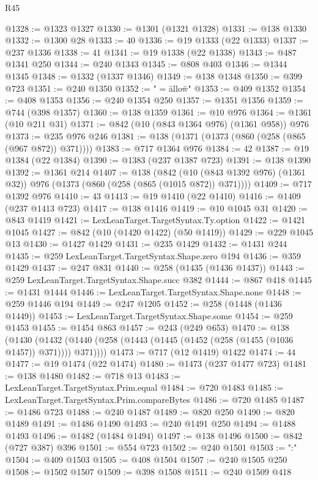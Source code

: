 \begin{lexlean}{R45}
\begin{coremodule}
@1328 := @1323 @1327
@1330 := @1301 (@1321 @1328)
@1331 := @138 @1330
@1332 := @1300 @28
@1333 := 40
@1336 := @19 @1333 (@22 @1333)
@1337 := @237 @1336
@1338 := 41
@1341 := @19 @1338 (@22 @1338)
@1343 := @487 @1341 @250
@1344 := @240 @1343
@1345 := @808 @403
@1346 := @1344 @1345
@1348 := @1332 (@1337 @1346)
@1349 := @138 @1348
@1350 := @399 @723
@1351 := @240 @1350
@1352 := " = \"allow\"\n"
@1353 := @409 @1352
@1354 := @408 @1353
@1356 := @240 @1354 @250
@1357 := @1351 @1356
@1359 := @744 (@398 @1357)
@1360 := @138 @1359
@1361 := @10 @976
@1364 := @1361 (@10 @211 @31)
@1371 := @842 (@10 (@843 @1364 @976) (@1361 @958)) @976
@1373 := @235 @976 @246
@1381 := @138 (@1371 (@1373 (@860 (@258 (@865 (@967 @872)) @371))))
@1383 := @717 @1364 @976
@1384 := 42
@1387 := @19 @1384 (@22 @1384)
@1390 := @1383 (@237 @1387 @723)
@1391 := @138 @1390
@1392 := @1361 @214
@1407 := @138
    (@842 (@10 (@843 @1392 @976) (@1361 @32)) @976 (@1373 (@860 (@258 (@865 (@1015 @872)) @371))))
@1409 := @717 @1392 @976
@1410 := 43
@1413 := @19 @1410 (@22 @1410)
@1416 := @1409 (@237 @1413 @723)
@1417 := @138 @1416
@1419 := @10 @1045 @31
@1420 := @843 @1419
@1421 := LexLeanTarget.TargetSyntax.Ty.option
@1422 := @1421 @1045
@1427 := @842 (@10 (@1420 @1422) (@50 @1419))
@1429 := @229 @1045 @13
@1430 := @1427 @1429
@1431 := @235 @1429
@1432 := @1431 @244
@1435 := @259 LexLeanTarget.TargetSyntax.Shape.zero @194
@1436 := @359 @1429
@1437 := @247 @831
@1440 := @258 (@1435 (@1436 @1437))
@1443 := @259 LexLeanTarget.TargetSyntax.Shape.succ @382
@1444 := @867 @418
@1445 := @1431 @1444
@1446 := LexLeanTarget.TargetSyntax.Shape.none
@1448 := @259 @1446 @194
@1449 := @247 @1205
@1452 := @258 (@1448 (@1436 @1449))
@1453 := LexLeanTarget.TargetSyntax.Shape.some
@1454 := @259 @1453
@1455 := @1454 @863
@1457 := @243 (@249 @653)
@1470 := @138
    (@1430 (@1432 (@1440 (@258 (@1443 (@1445 (@1452 (@258 (@1455 (@1036 @1457)) @371)))) @371))))
@1473 := @717 (@12 @1419) @1422
@1474 := 44
@1477 := @19 @1474 (@22 @1474)
@1480 := @1473 (@237 @1477 @723)
@1481 := @138 @1480
@1482 := @718 @13
@1483 := LexLeanTarget.TargetSyntax.Prim.equal
@1484 := @720 @1483
@1485 := LexLeanTarget.TargetSyntax.Prim.compareBytes
@1486 := @720 @1485
@1487 := @1486 @723
@1488 := @240 @1487
@1489 := @820 @250
@1490 := @820 @1489
@1491 := @1486 @1490
@1493 := @240 @1491 @250
@1494 := @1488 @1493
@1496 := @1482 (@1484 @1494)
@1497 := @138 @1496
@1500 := @842 (@727 @387) @396
@1501 := @554 @723
@1502 := @240 @1501
@1503 := ":"
@1504 := @409 @1503
@1505 := @408 @1504
@1507 := @240 @1505 @250
@1508 := @1502 @1507
@1509 := @398 @1508
@1511 := @240 @1509 @418

\end{coremodule}
\end{lexlean}
